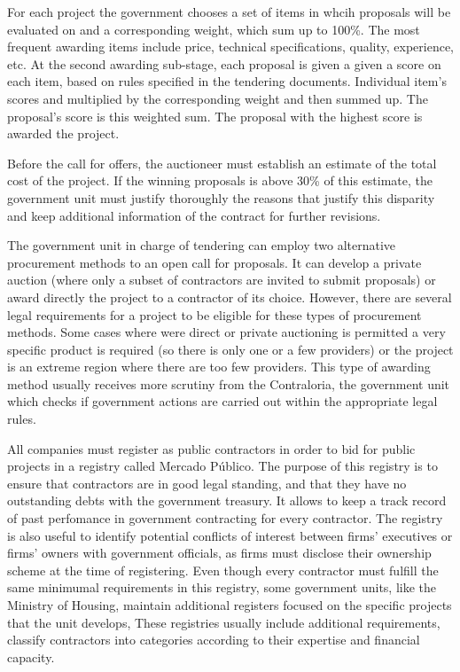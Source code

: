 For each project the government chooses a set of items in whcih proposals will be evaluated on and a corresponding weight, which sum up to 100\%. The most frequent awarding items include price, technical specifications, quality, experience, etc. At the second awarding sub-stage, each proposal is given a given a score on each item,  based on rules specified in the tendering documents. Individual item's scores and multiplied by the corresponding weight and then summed up. The proposal's score is this weighted sum. The proposal with the highest score is awarded the project.

Before the call for offers, the auctioneer must establish an estimate of the total cost of the project. If the winning proposals is above 30\% of this estimate, the government unit must justify thoroughly the reasons that justify this disparity and keep additional information of the contract for further revisions.

The government unit in charge of tendering can employ two alternative procurement methods to an open call for proposals. It can develop a private auction (where only a subset of contractors are invited to submit proposals) or award directly the project to a contractor of its choice. However, there are several legal requirements for a project to be eligible for these types of procurement methods. Some cases where were direct or private auctioning is permitted a very specific product is required (so there is only one or a few providers) or the project is an extreme region where there are too few providers. This type of awarding method usually receives more scrutiny from the Contraloria, the government unit which checks if government actions are carried out within the appropriate legal rules.

All companies must register as public contractors in order to bid for public projects in a registry called Mercado Público. The purpose of this registry is to ensure that contractors are in good legal standing, and that they have no outstanding debts with the government treasury. It allows to keep a track record of past perfomance in government contracting for every contractor. The registry is also useful to identify potential conflicts of interest between firms' executives or firms' owners with government officials, as firms must disclose their ownership scheme at the time of registering. Even though every contractor must fulfill the same minimumal requirements in this registry, some government units, like the Ministry of Housing, maintain additional registers focused on the specific projects that the unit develops, These registries usually include additional requirements, classify contractors into categories according to their expertise and financial capacity.

